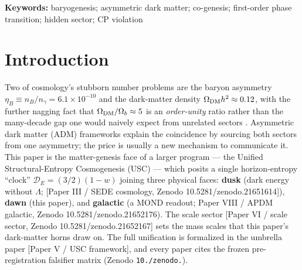 \documentclass[aps,prd,preprint,nofootinbib,superscriptaddress]{revtex4-2}
\begin{document}
\begin{abstract}
\textbf{normal ordering, \(\Sigma m_\nu \approx 59\text{–}64\) meV, and
\(T_{\rm RH} \approx 3.3\times10^{12}\) GeV} \citep{Elbers:2025vlz}. We
are explicit that this range \emph{brushes the normal-ordering floor}
(\(\Sigma m_\nu \gtrsim 58\) meV): it is a \textbf{consistency
constraint, not a discriminating prediction} --- its confirmation would
not single out ECCG, and its inverted-ordering falsification is DESI's
own conclusion, independent of this model. It survives in only
\textasciitilde1\% of prior impulse-volume, so it constrains the
mechanism without testing it against the null. The magnitude of
\(\eta_B\) is irreducibly a fit; the microscopic strong-coupling inputs
(the first-order transition, the confining vacuum, the wall velocity)
are validated pipelines producing preliminary numbers, not confirmed
results. We say so throughout, and list the falsifiers.
\end{abstract}

\maketitle

\noindent\textbf{Keywords:} baryogenesis; asymmetric dark matter;
co-genesis; first-order phase transition; hidden sector; CP violation
\vspace{6pt}

\section{Introduction}\label{sec-1}

Two of cosmology's stubborn number problems are the baryon asymmetry
\(\eta_B \equiv n_B/n_\gamma = 6.1\times10^{-10}\) and the dark-matter
density \(\Omega_{\rm DM} h^{2} \approx 0.12\), with the further nagging
fact that \(\Omega_{\rm DM}/\Omega_b \approx 5\) is an
\emph{order-unity} ratio rather than the many-decade gap one would
naively expect from unrelated sectors
\citep{Boucenna:2013wba, Davoudiasl:2012uw}. Asymmetric dark matter
(ADM) frameworks \citep{Kaplan:2009ag, Petraki:2013wwa, Zurek:2013wia}
explain the coincidence by sourcing both sectors from one asymmetry; the
price is usually a new mechanism to communicate it. This paper is the
matter-genesis face of a larger program --- the Unified
Structural-Entropy Cosmogenesis (USC) --- which posits a single
horizon-entropy ``clock'' \(\mathcal{D}_E = (3/2)(1-w)\) joining three
physical faces: \textbf{dusk} (dark energy without \(\Lambda\); {[}Paper
III / SEDE cosmology, Zenodo 10.5281/zenodo.21651614{]}), \textbf{dawn}
(this paper), and \textbf{galactic} (a MOND readout; Paper VIII / APDM
galactic, Zenodo 10.5281/zenodo.21652176). The scale sector {[}Paper VI
/ scale sector, Zenodo 10.5281/zenodo.21652167{]} sets the mass scales
that this paper's dark-matter horns draw on. The full unification is
formalized in the umbrella paper {[}Paper V / USC framework{]}, and
every paper cites the frozen pre-registration falsifier matrix (Zenodo
\texttt{10./\allowbreak zenodo.}).
\end{document}
